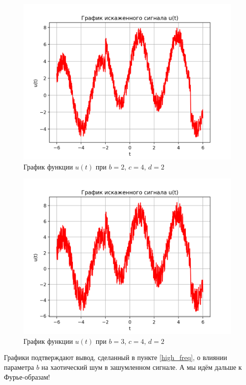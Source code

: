 \begin{figure}[ht!]
    \centering
    \includegraphics[scale=0.75]{media/1 task/specific_freq/Noisy_2_4_2.png}
    \caption{График функции $u(t)$ при $b=2$,  $c=4$,  $d=2$}
    \label{fig:noisy_2_4_2}
\end{figure}

\clearpage

\begin{figure}[ht!]
    \centering
    \includegraphics[scale=0.75]{media/1 task/specific_freq/Noisy_3_4_2.png}
    \caption{График функции $u(t)$ при $b=3$,  $c=4$,  $d=2$}
    \label{fig:noisy_3_4_2}
\end{figure}

Графики подтверждают вывод, сделанный в пункте \ref{high_freq}, о влиянии параметра $b$ на хаотический шум в зашумленном сигнале. А мы идём дальше к Фурье-образам!

